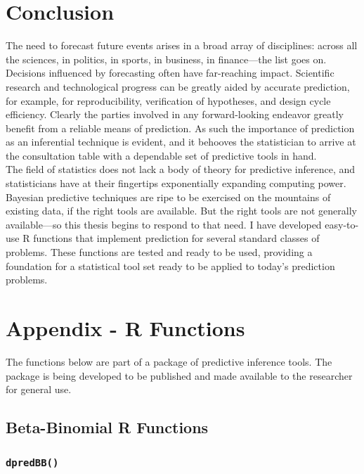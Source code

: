 \documentclass[12pt, a4paper]{article}
\begin{document}
\clearpage

\section{Conclusion}

The need to forecast future events arises in a broad array of disciplines: across all the sciences, in politics, in sports, in business, in finance---the list goes on.  Decisions influenced by forecasting often have far-reaching impact.  Scientific research and technological progress can be greatly aided by accurate prediction, for example, for reproducibility, verification of hypotheses, and design cycle efficiency.  Clearly the parties involved in any forward-looking endeavor greatly benefit from a reliable means of prediction.  As such the importance of prediction as an inferential technique is evident, and it behooves the statistician to arrive at the consultation table with a dependable set of predictive tools in hand.\\

\noindent The field of statistics does not lack a body of theory for predictive inference, and statisticians have at their fingertips exponentially expanding computing power.  Bayesian predictive techniques are ripe to be exercised on the mountains of existing data, if the right tools are available.  But the right tools are not generally available---so this thesis begins to respond to that need.  I have developed easy-to-use R functions that implement prediction for several standard classes of problems.  These functions are tested and ready to be used, providing a foundation for a statistical tool set ready to be applied to today's prediction problems.

\clearpage

\section{Appendix - R Functions}

The functions below are part of a package of predictive inference tools.  The package is being developed to be published and made available to the researcher for general use.

  \subsection{Beta-Binomial R Functions}
    \subsubsection{\texttt{dpredBB()}}\label{sec:dpredBB}
\end{document}
